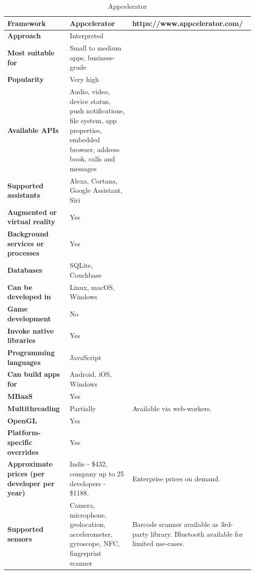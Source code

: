 \documentclass[english,master,public,dept460,male,cpdeclaration,oneside]{diploma}
\begin{document}
\begin{table}[!h]
\centering
\caption{Appcelerator}
\begin{tabular}{p{} | p{} | p{}}
	\toprule		
	\textbf{Framework} & \textbf{Appcelerator} & https://www.appcelerator.com/ \\
	\midrule
	\textbf{Approach} & Interpreted & \\			
	\midrule	
	\textbf{Most suitable for} & Small to medium apps, business-grade & \\
	\midrule
	\textbf{Popularity} & Very high & \\			
	\midrule
	\textbf{Available APIs} & Audio, video, device status, push notifications, file system, app properties, embedded browser, address book, calls and messages & \\			
	\midrule
	\textbf{Supported assistants} & Alexa, Cortana, Google Assistant, Siri & \\			
	\midrule
	\textbf{Augmented or virtual reality} & Yes & \\			
	\midrule
	\textbf{Background services or processes} & Yes & \\			
	\midrule
	\textbf{Databases} & SQLite, Couchbase & \\			
	\midrule
	\textbf{Can be developed in} & Linux, macOS, Windows &  \\			
	\midrule
	\textbf{Game development} & No & \\			
	\midrule
	\textbf{Invoke native libraries} & Yes & \\			
	\midrule
	\textbf{Programming languages} & JavaScript & \\			
	\midrule
	\textbf{Can build apps for} & Android, iOS, Windows & \\			
	\midrule
	\textbf{MBaaS} & Yes & \\			
	\midrule
	\textbf{Multithreading} & Partially & Available via web-workers. \\			
	\midrule
	\textbf{OpenGL} & Yes & \\			
	\midrule
	\textbf{Platform-specific overrides} & Yes & \\			
	\midrule
	\textbf{Approximate prices (per developer per year)} & Indie - \$432, company up to 25 developers - \$1188. & Enterprise prices on demand. \\			
	\midrule
	\textbf{Supported sensors} & Camera, microphone, geolocation, accelerometer, gyroscope, NFC, fingerprint scanner & Barcode scanner available as 3rd-party library. Bluetooth available for limited use-cases.\\			
	\midrule
\end{tabular}
\end{table}
\end{document}
